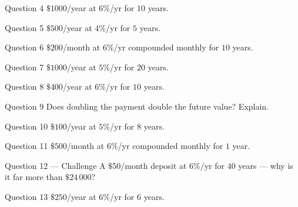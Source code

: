 \documentclass[11pt]{article}
\begin{document}
\begin{qbox}{Question 4}
$\$1000$/year at $6\%$/yr for $10$ years.\workspace{2.4cm}
\end{qbox}

\begin{qbox}{Question 5}
$\$500$/year at $4\%$/yr for $5$ years.\workspace{2.4cm}
\end{qbox}

\begin{qbox}{Question 6}
$\$200$/month at $6\%$/yr compounded monthly for $10$ years.\workspace{2.4cm}
\end{qbox}

\begin{qbox}{Question 7}
$\$1000$/year at $5\%$/yr for $20$ years.\workspace{2.4cm}
\end{qbox}

\begin{qbox}{Question 8}
$\$400$/year at $6\%$/yr for $10$ years.\workspace{2.4cm}
\end{qbox}

\begin{qbox}{Question 9}
Does doubling the payment double the future value? Explain.\workspace{2.4cm}
\end{qbox}

\begin{qbox}{Question 10}
$\$100$/year at $5\%$/yr for $8$ years.\workspace{2.4cm}
\end{qbox}

\begin{qbox}{Question 11}
$\$500$/month at $6\%$/yr compounded monthly for $1$ year.\workspace{2.4cm}
\end{qbox}

\begin{qbox}{Question 12 --- Challenge}
A $\$50$/month deposit at $6\%$/yr for $40$ years — why is it far more than $\$24\,000$?\workspace{3.2cm}
\end{qbox}

\begin{qbox}{Question 13}
$\$250$/year at $6\%$/yr for $6$ years.\workspace{2.4cm}
\end{qbox}

\clearpage
{}
\end{document}
